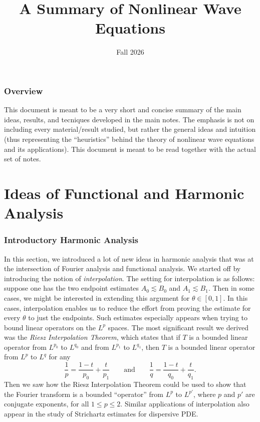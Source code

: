 \documentclass{article}
\title{A Summary of Nonlinear Wave Equations}
\author{\me}
\date{Fall 2026}
\begin{document}
	\maketitle
	\fullline 
	\tableofcontents
	\xappto\thefootnote{\relax}
	\halfline 
	\newpage 
	\setlength{\parskip}{0.55em}
	\section{Overview}
	This document is meant to be a very short and concise summary of the main ideas, results, and tecniques developed in the main notes. The emphasis is not on including every material/result studied, but rather the general ideas and intuition (thus representing the ``heuristics'' behind the theory of nonlinear wave equations and its applications). This document is meant to be read together with the actual set of notes. 
	
	\newpage 
	\part{Ideas of Functional and Harmonic Analysis}
	
	\section{Introductory Harmonic Analysis}
	
	In this section, we introduced a lot of new ideas in harmonic analysis that was at the intersection of Fourier analysis and functional analysis. We started off by introducing the notion of \textit{interpolation}. The setting for interpolation is as follows: suppose one has the two endpoint estimates $A_{0} \lesssim B_{0}$ and $A_{1} \lesssim B_{1}$. Then in some cases, we might be interested in extending this argument for $\theta \in [0,1]$. In this cases, interpolation enables us to reduce the effort from proving the estimate for every $\theta$ to just the endpoints. Such estimates especially appears when trying to bound linear operators on the $L^{p}$ spaces. The most significant result we derived was the \textit{Riesz Interpolation Theorem}, which states that if $T$ is a bounded linear operator from $L^{p_{0}}$ to $L^{q_{0}}$ and from $L^{p_{1}}$ to $L^{q_{1}}$, then $T$ is a bounded linear operator from $L^{p}$ to $L^{q}$ for any 
	\begin{equation*}
		\frac{1}{p} = \frac{1 - t}{p_{0}} + \frac{t}{p_{1}} \qquad \text{and}\qquad \frac{1}{q} = \frac{1 - t}{q_{0}} + \frac{t}{q_{1}}. 
	\end{equation*} 
	Then we saw how the Riesz Interpolation Theorem could be used to show that the Fourier transform is a bounded ``operator'' from $L^{p}$ to $L^{p'}$, where $p$ and $p'$ are conjugate exponents, for all $1 \leq p \leq 2$. Similar applications of interpolation also appear in the study of Strichartz estimates for dispersive PDE. 
	
\end{document}
